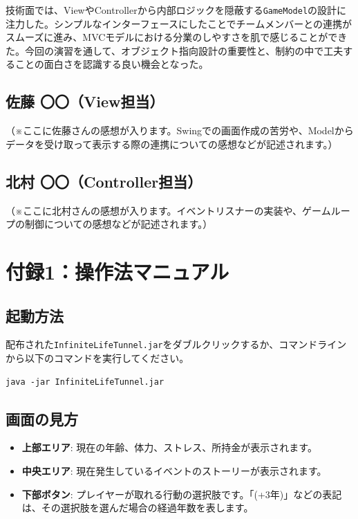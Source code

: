 \documentclass[a4paper,11pt]{jsarticle}
\begin{document}
技術面では、ViewやControllerから内部ロジックを隠蔽する\texttt{GameModel}の設計に注力した。シンプルなインターフェースにしたことでチームメンバーとの連携がスムーズに進み、MVCモデルにおける分業のしやすさを肌で感じることができた。今回の演習を通して、オブジェクト指向設計の重要性と、制約の中で工夫することの面白さを認識する良い機会となった。

\subsection{佐藤 〇〇（View担当）}
（※ここに佐藤さんの感想が入ります。Swingでの画面作成の苦労や、Modelからデータを受け取って表示する際の連携についての感想などが記述されます。）

\subsection{北村 〇〇（Controller担当）}
（※ここに北村さんの感想が入ります。イベントリスナーの実装や、ゲームループの制御についての感想などが記述されます。）

\appendix
\section{付録1：操作法マニュアル}

\subsection*{起動方法}
配布された\texttt{InfiniteLifeTunnel.jar}をダブルクリックするか、コマンドラインから以下のコマンドを実行してください。
\begin{verbatim}
java -jar InfiniteLifeTunnel.jar
\end{verbatim}

\subsection*{画面の見方}
\begin{itemize}
    \item \textbf{上部エリア}: 現在の年齢、体力、ストレス、所持金が表示されます。
    \item \textbf{中央エリア}: 現在発生しているイベントのストーリーが表示されます。
    \item \textbf{下部ボタン}: プレイヤーが取れる行動の選択肢です。「(+3年)」などの表記は、その選択肢を選んだ場合の経過年数を表します。
\end{itemize}
\end{document}
